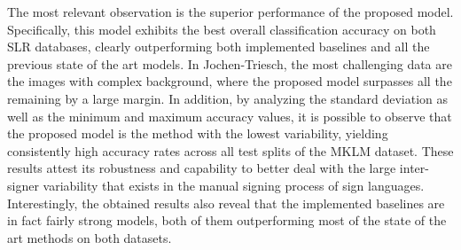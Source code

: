 \begin{table}[t]
    \centering
    \caption{Classification accuracy (\%) of the proposed adversarial method and baselines on Jochen-Triesch and MKLM datasets.}
    \label{tab:adv_signer_inv_results}
\end{table}

The most relevant observation is the superior performance of the proposed model. Specifically, this model exhibits the best overall classification accuracy on both SLR databases, clearly outperforming both implemented baselines and all the previous state of the art models. In Jochen-Triesch, the most challenging data are the images with complex background, where the proposed model surpasses all the remaining by a large margin. In addition, by analyzing the standard deviation as well as the minimum and maximum accuracy values, it is possible to observe that the proposed model is the method with the lowest variability, yielding consistently high accuracy rates across all test splits of the MKLM dataset. These results attest its robustness and capability to better deal with the large inter-signer variability that exists in the manual signing process of sign languages. Interestingly, the obtained results also reveal that the implemented baselines are in fact fairly strong models, both of them outperforming most of the state of the art methods on both datasets.

